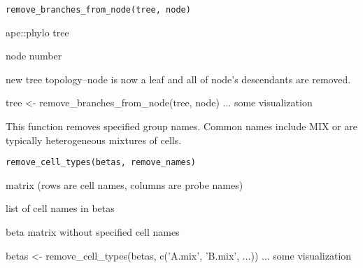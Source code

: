 \documentclass[a4paper]{book}
\begin{document}
%
\begin{Usage}
\begin{verbatim}
remove_branches_from_node(tree, node)
\end{verbatim}
\end{Usage}
%
\begin{Arguments}
\begin{ldescription}
\item[\code{tree}] ape::phylo tree

\item[\code{node}] node number
\end{ldescription}
\end{Arguments}
%
\begin{Value}
new tree topology--node is now a leaf and all of node's descendants 
are removed.
\end{Value}
%
\begin{Examples}
\begin{ExampleCode}
tree <- remove_branches_from_node(tree, node)
... some visualization 
\end{ExampleCode}
\end{Examples}
%
\begin{Description}\relax
This function removes specified group names. Common names include MIX or 
are typically heterogeneous mixtures of cells.
\end{Description}
%
\begin{Usage}
\begin{verbatim}
remove_cell_types(betas, remove_names)
\end{verbatim}
\end{Usage}
%
\begin{Arguments}
\begin{ldescription}
\item[\code{betas}] matrix (rows are cell names, columns are probe names)

\item[\code{remove\_names}] list of cell names in betas
\end{ldescription}
\end{Arguments}
%
\begin{Value}
beta matrix without specified cell names
\end{Value}
%
\begin{Examples}
\begin{ExampleCode}
betas <- remove_cell_types(betas, c('A.mix', 'B.mix', ...))
... some visualization 
\end{ExampleCode}
\end{Examples}
\end{document}
